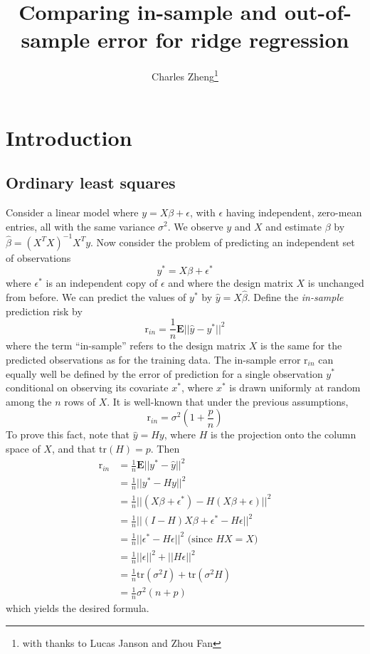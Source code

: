 \documentclass[11pt]{article}
\begin{document}
\newcommand{\tr}{\text{tr}}
\newcommand{\E}{\textbf{E}}
\newcommand{\diag}{\text{diag}}
\newcommand{\argmax}{\text{argmax}}
\newcommand{\argmin}{\text{argmin}}
\newcommand{\Cov}{\text{Cov}}
\newcommand{\Vol}{\text{Vol}}

\title{Comparing in-sample and out-of-sample error for ridge regression}

\author{Charles Zheng\thanks{with thanks to Lucas Janson and Zhou Fan}}

\maketitle

\section{Introduction}

\subsection{Ordinary least squares}

Consider a linear model where $y = X\beta + \epsilon$, with $\epsilon$
having independent, zero-mean entries, all with the same variance
$\sigma^2$.  We observe $y$ and $X$ and estimate $\beta$ by
$\hat{\beta} = (X^T X)^{-1} X^T y$.  Now consider the problem of
predicting an independent set of observations
\[
y^* = X\beta + \epsilon^*
\]
where $\epsilon^*$ is an independent copy of $\epsilon$ and where the
design matrix $X$ is unchanged from before.  We can predict the values
of $y^*$ by $\hat{y} = X\hat{\beta}$.  Define the \emph{in-sample}
prediction risk by
\[
\text{r}_{in} = \frac{1}{n} \E ||\hat{y} - y^*||^2
\]
where the term ``in-sample'' refers to the design matrix $X$ is the
same for the predicted observations as for the training data.  The
in-sample error $\text{r}_{in}$ can equally well be defined by the
error of prediction for a single observation $y^*$ conditional on
observing its covariate $x^*$, where $x^*$ is drawn uniformly at
random among the $n$ rows of $X$.  It is well-known that under the
previous assumptions,
\[
\text{r}_{in} = \sigma^2 \left(1 + \frac{p}{n}\right)
\]
To prove this fact, note that $\hat{y} = Hy$, where $H$ is the
projection onto the column space of $X$, and that $\tr(H) = p$.  Then
\begin{align*}
\text{r}_{in} &= \frac{1}{n} \E ||y^* - \hat{y}||^2
\\&= \frac{1}{n} ||y^* - Hy||^2
\\&= \frac{1}{n} ||(X\beta + \epsilon^*) - H(X\beta + \epsilon)||^2
\\&= \frac{1}{n} ||(I-H)X\beta + \epsilon^* - H\epsilon||^2
\\&= \frac{1}{n} ||\epsilon^* - H\epsilon||^2 \text{ (since $HX = X$) }
\\&= \frac{1}{n} ||\epsilon||^2 + ||H\epsilon||^2
\\&= \frac{1}{n} \tr(\sigma^2 I) + \tr(\sigma^2 H)
\\&= \frac{1}{n} \sigma^2(n + p)
\end{align*}
which yields the desired formula.
\end{document}
